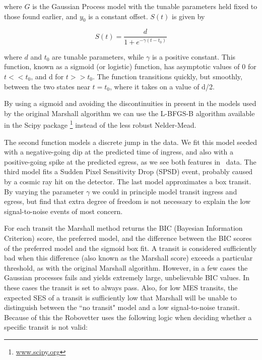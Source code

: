 \noindent
where $G$ is the Gaussian Process model with the tunable parameters held fixed to those found earlier, and $y_0$ is a constant offset. $S(t)$ is given by

\begin{equation}
S(t) = \frac{d}{1 + e^{-\gamma (t-t_0)} }
\end{equation}

\noindent
where $d$ and $t_0$ are tunable parameters, while $\gamma$ is a positive constant. This function, known as a sigmoid (or logistic) function, has asymptotic values of 0 for $t<<t_0$, and d for $t>>t_0$. The function transitions quickly, but smoothly, between the two states near $t=t_0$, where it takes on a value of d/2. 

By using a sigmoid and avoiding the discontinuities in present in the models used by the original Marshall algorithm \citep{Mullally2016} we can use the L-BFGS-B algorithm \citep{Byrd95} available in the Scipy package \footnote{\url{www.scipy.org}} instead of the less robust Nelder-Mead.

The second function models a discrete jump in the data. We fit this model seeded with a negative-going dip at the predicted time of ingress, and also with a positive-going spike at the predicted egress, as we see both features in \Kepler\ data. The third model fits a Sudden Pixel Sensitivity Drop (SPSD) event, probably caused by a cosmic ray hit on the detector. The last model approximates a box transit. By varying the parameter $\gamma$ we could in principle model transit ingress and egress, but find that extra degree of freedom is not necessary to explain the low signal-to-noise events of most concern.

For each transit the Marshall method returns the BIC (Bayesian Information Criterion) score, the preferred model, and the difference between the BIC scores of the preferred model and the sigmoid box fit.  A transit is considered sufficiently bad when this difference (also known as the Marshall score) exceeds a particular threshold, as with the original Marshall algorithm.  However, in a few cases the Gaussian processes fails and yields extremely large, unbelievable BIC values. In these cases the transit is set to always pass.  Also, for low MES transits, the expected SES of a transit is sufficiently low that Marshall will be unable to distinguish between the ``no transit" model and a low signal-to-noise transit.  Because of this the Robovetter uses the following logic when deciding whether a specific transit is not valid:



